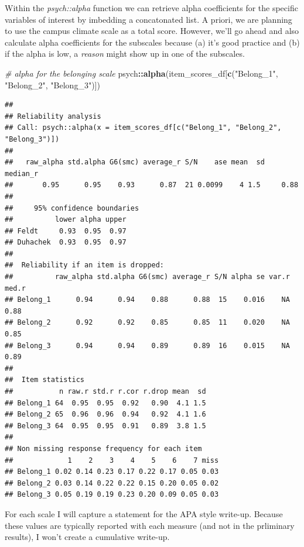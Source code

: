 \documentclass[
  11pt,
]{book}
\newenvironment{Shaded}{\begin{snugshade}}{\end{snugshade}}
\newcommand{\CommentTok}[1]{\textcolor[rgb]{0.37,0.37,0.37}{\textit{#1}}}
\newcommand{\FunctionTok}[1]{\textcolor[rgb]{0.27,0.27,0.27}{\textbf{#1}}}
\newcommand{\NormalTok}[1]{#1}
\newcommand{\SpecialCharTok}[1]{\textcolor[rgb]{0.43,0.43,0.43}{\textbf{#1}}}
\newcommand{\StringTok}[1]{\textcolor[rgb]{0.5,0.5,0.5}{#1}}
\begin{document}
Within the \emph{psych::alpha} function we can retrieve alpha coefficients for the specific variables of interest by imbedding a concatonated list. A priori, we are planning to use the campus climate scale as a total score. However, we'll go ahead and also calculate alpha coefficients for the subscales because (a) it's good practice and (b) if the alpha is low, a \emph{reason} might show up in one of the subscales.

\begin{Shaded}
\begin{Highlighting}[]
\CommentTok{\# alpha for the belonging scale}
\NormalTok{psych}\SpecialCharTok{::}\FunctionTok{alpha}\NormalTok{(item\_scores\_df[}\FunctionTok{c}\NormalTok{(}\StringTok{"Belong\_1"}\NormalTok{, }\StringTok{"Belong\_2"}\NormalTok{, }\StringTok{"Belong\_3"}\NormalTok{)])}
\end{Highlighting}
\end{Shaded}

\begin{verbatim}
## 
## Reliability analysis   
## Call: psych::alpha(x = item_scores_df[c("Belong_1", "Belong_2", "Belong_3")])
## 
##   raw_alpha std.alpha G6(smc) average_r S/N    ase mean  sd median_r
##       0.95      0.95    0.93      0.87  21 0.0099    4 1.5     0.88
## 
##     95% confidence boundaries 
##          lower alpha upper
## Feldt     0.93  0.95  0.97
## Duhachek  0.93  0.95  0.97
## 
##  Reliability if an item is dropped:
##          raw_alpha std.alpha G6(smc) average_r S/N alpha se var.r med.r
## Belong_1      0.94      0.94    0.88      0.88  15    0.016    NA  0.88
## Belong_2      0.92      0.92    0.85      0.85  11    0.020    NA  0.85
## Belong_3      0.94      0.94    0.89      0.89  16    0.015    NA  0.89
## 
##  Item statistics 
##           n raw.r std.r r.cor r.drop mean  sd
## Belong_1 64  0.95  0.95  0.92   0.90  4.1 1.5
## Belong_2 65  0.96  0.96  0.94   0.92  4.1 1.6
## Belong_3 64  0.95  0.95  0.91   0.89  3.8 1.5
## 
## Non missing response frequency for each item
##             1    2    3    4    5    6    7 miss
## Belong_1 0.02 0.14 0.23 0.17 0.22 0.17 0.05 0.03
## Belong_2 0.03 0.14 0.22 0.22 0.15 0.20 0.05 0.02
## Belong_3 0.05 0.19 0.19 0.23 0.20 0.09 0.05 0.03
\end{verbatim}

For each scale I will capture a statement for the APA style write-up. Because these values are typically reported with each measure (and not in the prliminary results), I won't create a cumulative write-up.
\end{document}
